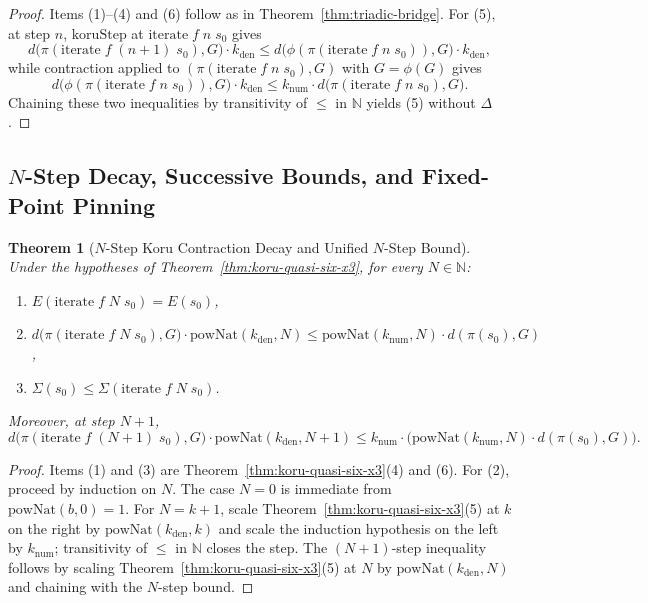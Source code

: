 \documentclass[12pt,a4paper]{article}
\newtheorem{theorem}[thm]{Theorem}
\begin{document}
\begin{proof}
Items (1)--(4) and (6) follow as in Theorem~\ref{thm:triadic-bridge}. For (5), at step $n$, $\mathrm{koruStep}$ at $\mathrm{iterate}\;f\;n\;s_0$ gives
\[
d\bigl(\pi(\mathrm{iterate}\;f\;(n+1)\;s_0), G\bigr) \cdot k_{\mathrm{den}} \le d\bigl(\phi(\pi(\mathrm{iterate}\;f\;n\;s_0)), G\bigr) \cdot k_{\mathrm{den}},
\]
while contraction applied to $(\pi(\mathrm{iterate}\;f\;n\;s_0), G)$ with $G = \phi(G)$ gives
\[
d\bigl(\phi(\pi(\mathrm{iterate}\;f\;n\;s_0)), G\bigr) \cdot k_{\mathrm{den}} \le k_{\mathrm{num}} \cdot d\bigl(\pi(\mathrm{iterate}\;f\;n\;s_0), G\bigr).
\]
Chaining these two inequalities by transitivity of $\le$ in $\mathbb{N}$ yields (5) without $\Delta$.
\end{proof}

\subsection{$N$-Step Decay, Successive Bounds, and Fixed-Point Pinning}

\begin{theorem}[$N$-Step Koru Contraction Decay and Unified $N$-Step Bound]
\label{thm:unified-n-step}
Under the hypotheses of Theorem~\ref{thm:koru-quasi-six-x3}, for every $N \in \mathbb{N}$:
\begin{enumerate}
  \item $E(\mathrm{iterate}\;f\;N\;s_0) = E(s_0)$,
  \item $d\bigl(\pi(\mathrm{iterate}\;f\;N\;s_0), G\bigr) \cdot \mathrm{powNat}(k_{\mathrm{den}}, N) \le \mathrm{powNat}(k_{\mathrm{num}}, N) \cdot d(\pi(s_0), G)$,
  \item $\Sigma(s_0) \le \Sigma(\mathrm{iterate}\;f\;N\;s_0)$.
\end{enumerate}
Moreover, at step $N + 1$,
\[
d\bigl(\pi(\mathrm{iterate}\;f\;(N+1)\;s_0), G\bigr) \cdot \mathrm{powNat}(k_{\mathrm{den}}, N+1) \le k_{\mathrm{num}} \cdot \bigl(\mathrm{powNat}(k_{\mathrm{num}}, N) \cdot d(\pi(s_0), G)\bigr).
\]
\end{theorem}

\begin{proof}
Items (1) and (3) are Theorem~\ref{thm:koru-quasi-six-x3}(4) and (6). For (2), proceed by induction on $N$. The case $N = 0$ is immediate from $\mathrm{powNat}(b, 0) = 1$. For $N = k + 1$, scale Theorem~\ref{thm:koru-quasi-six-x3}(5) at $k$ on the right by $\mathrm{powNat}(k_{\mathrm{den}}, k)$ and scale the induction hypothesis on the left by $k_{\mathrm{num}}$; transitivity of $\le$ in $\mathbb{N}$ closes the step. The $(N+1)$-step inequality follows by scaling Theorem~\ref{thm:koru-quasi-six-x3}(5) at $N$ by $\mathrm{powNat}(k_{\mathrm{den}}, N)$ and chaining with the $N$-step bound.
\end{proof}
\end{document}
